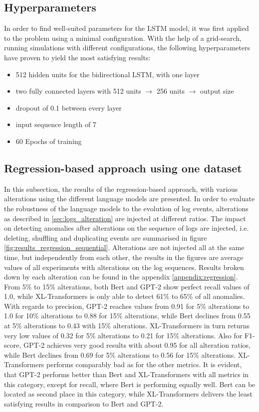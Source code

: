 \subsection{Hyperparameters}
In order to find well-suited parameters for the LSTM model, it was first applied to the problem using a minimal configuration. With the help of a grid-search, running simulations with different configurations, the following hyperparameters have proven to yield the most satisfying results:
\begin{itemize}
	\item 512 hidden units for the bidirectional LSTM, with one layer
	\item two fully connected layers with 512 units $\rightarrow$ 256 units $\rightarrow$ output size
	\item dropout of 0.1 between every layer
	\item input sequence length of 7
	\item 60 Epochs of training
\end{itemize}

\subsection{Regression-based approach using one dataset\label{sec:results-regression}}
In this subsection, the results of the regression-based approach, with various alterations using the different language models are presented. In order to evaluate the robustness of the language models to the evolution of log events, alterations as described in \ref{sec:logs_alteration} are injected at different ratios. The impact on detecting anomalies after alterations on the sequence of logs are injected, i.e. deleting, shuffling and duplicating events are summarised in figure \ref{fig:results_regression_sequential}. Alterations are not injected all at the same time, but independently from each other, the results in the figures are average values of all experiments with alterations on the log sequences. Results broken down by each alteration can be found in the appendix \ref{appendix:regression}. From 5\% to 15\% alterations, both Bert and GPT-2 show perfect recall values of 1.0, while XL-Transformers is only able to detect 61\% to 65\% of all anomalies. With regards to precision, GPT-2 reaches values from 0.91 for 5\% alterations to 1.0 for 10\% alterations to 0.88 for 15\% alterations, while Bert declines from 0.55 at 5\% alterations to 0.43 with 15\% alterations. XL-Transformers in turn returns very low values of 0.32 for 5\% alterations to 0.21 for 15\% alterations. Also for F1-score, GPT-2 achieves very good results with about 0.95 for all alteration ratios, while Bert declines from 0.69 for 5\% alterations to 0.56 for 15\% alterations. XL-Transformers performs comparably bad as for the other metrics. It is evident, that GPT-2 performs better than Bert and XL-Transformers with all metrics in this category, except for recall, where Bert is performing equally well. Bert can be located as second place in this category, while XL-Transformers delivers the least satisfying results in comparison to Bert and GPT-2.

